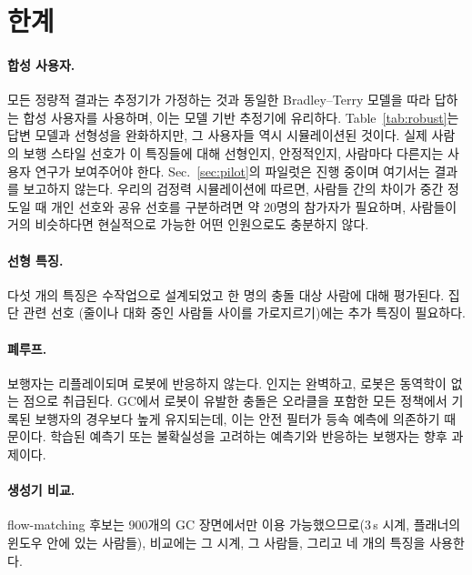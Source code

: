 \section{한계}
\label{sec:limitations}

\paragraph{합성 사용자.} 모든 정량적 결과는 추정기가 가정하는 것과 동일한 Bradley--Terry 모델을 따라 답하는 합성 사용자를 사용하며,
이는 모델 기반 추정기에 유리하다. Table~\ref{tab:robust}는 답변 모델과 선형성을 완화하지만, 그 사용자들 역시
시뮬레이션된 것이다. 실제 사람의 보행 스타일 선호가 이 특징들에 대해 선형인지,
안정적인지, 사람마다 다른지는 사용자 연구가 보여주어야 한다. Sec.~\ref{sec:pilot}의 파일럿은 진행 중이며 여기서는
결과를 보고하지 않는다. 우리의 검정력 시뮬레이션에 따르면, 사람들 간의 차이가 중간 정도일 때 개인 선호와 공유 선호를 구분하려면
약 20명의 참가자가 필요하며, 사람들이 거의 비슷하다면 현실적으로 가능한 어떤 인원으로도 충분하지 않다.

\paragraph{선형 특징.} 다섯 개의 특징은 수작업으로 설계되었고 한 명의 충돌 대상 사람에 대해 평가된다. 집단 관련 선호
(줄이나 대화 중인 사람들 사이를 가로지르기)에는 추가 특징이 필요하다.

\paragraph{폐루프.} 보행자는 리플레이되며 로봇에 반응하지 않는다. 인지는 완벽하고, 로봇은 동역학이 없는 점으로 취급된다.
GC에서 로봇이 유발한 충돌은 오라클을 포함한 모든 정책에서 기록된 보행자의 경우보다 높게 유지되는데, 이는 안전
필터가 등속 예측에 의존하기 때문이다. 학습된 예측기 또는 불확실성을 고려하는 예측기와 반응하는 보행자는 향후 과제이다.

\paragraph{생성기 비교.} flow-matching 후보는 900개의 GC 장면에서만 이용 가능했으므로(3\,s 시계, 플래너의
윈도우 안에 있는 사람들), 비교에는 그 시계, 그 사람들, 그리고 네 개의 특징을 사용한다.

